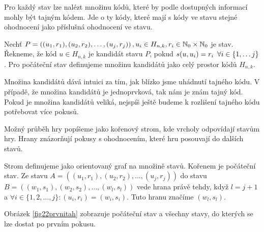 Pro každý stav lze nalézt množinu kódů, které by podle dostupných informací mohly být tajným kódem. Jde o ty kódy, které mají s kódy ve stavu stejné ohodnocení jako příslušná ohodnocení ve stavu. 

\begin{definice}[kandidát]\label{kandidat}
  Nechť $P = \left((u_1, r_1), (u_2,r_2), \dots, (u_j,r_j)\right), u_i \in H_{n,k}, r_i \in \mathbb{N} _0 \times \mathbb{N} _0$ je stav. Řekneme, že kód $u \in H_{n,k}$ je kandidát stavu $P$, pokud $s(u,u_i) = r_i \hspace{5px} \forall i \in \{1, \dots j\}$. Pro počáteční stav definujeme množinu kandidátů jako celý prostor kódů $H_{n,k}$.

\end{definice}
Množina kandidátů dává intuici za tím, jak blízko jsme uhádnutí tajného kódu. V případě, že množina kandidátů je jednoprvková, tak nám je znám tajný kód. Pokud je množina kandidátů veliká, nejspíš ještě budeme k rozlišení tajného kódu potřebovat více pokusů.


Možný průběh hry popíšeme jako kořenový strom, kde vrcholy odpovídají stavům hry. Hrany znázorňují pokusy s ohodnocením, které hru posouvají do dalších stavů. 

\begin{definice}
  Strom  definujeme jako orientovaný graf na množině stavů. Kořenem je počáteční stav. Ze stavu $A = \left((u_1, r_1), (u_2,r_2), \dots, (u_j,r_j)\right)$ do stavu $B = \left((w_1, s_1), (w_2,s_2), \dots, (w_l,s_l)\right)$ vede hrana právě tehdy, když $l = j+1$ a $\forall i \in \{1,2,\dots, j\} \colon (u_i, r_i) = (w_i, s_i)$. Tuto hranu značíme $(w_l, s_l)$. 
\end{definice}

Obrázek \ref{fig22prvnitah} zobrazuje počáteční stav a všechny stavy, do kterých se lze dostat po prvním pokusu. 


